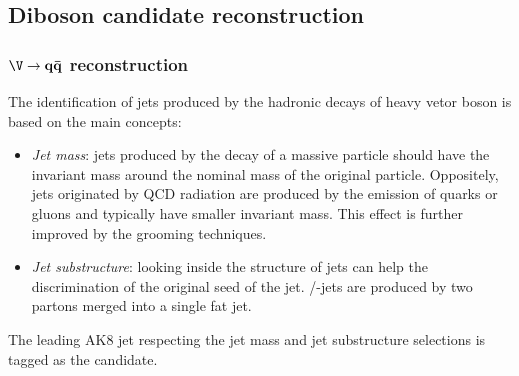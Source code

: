 \subsection{Diboson candidate reconstruction}

\subsubsection{$\mathbf{\V \rightarrow q \bar{q}}$ reconstruction}
\label{ssec:Vcand}
The identification of jets produced by the hadronic decays of heavy vetor boson is based on the main concepts:
\begin{itemize}
  \item \textit{Jet mass}: jets produced by the decay of a massive particle should have the invariant mass around the nominal mass of the original particle. Oppositely, jets originated by QCD radiation are produced by the emission of quarks or gluons and typically have smaller invariant mass. This effect is further improved by the grooming techniques.
  \item \textit{Jet substructure}: looking inside the structure of jets can help the discrimination of the original seed of the jet. \Z/\W-jets are produced by two partons merged into a single fat jet.
\end{itemize}

\noindent The leading AK8 jet respecting the jet mass and jet substructure selections is tagged as the \V candidate.


